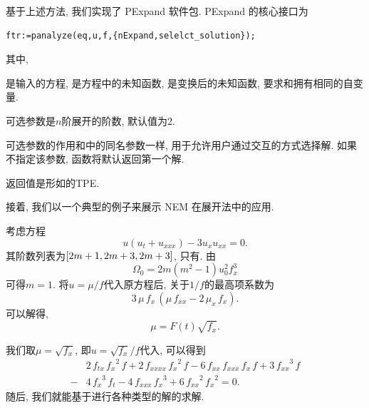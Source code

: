 基于上述方法, 我们实现了 PExpand 软件包. PExpand 的核心接口为
\begin{verbatim}
ftr:=panalyze(eq,u,f,{nExpand,selelct_solution});
\end{verbatim}
其中,
\begin{compactitem}[\textbullet]
\item {}是输入的方程, 是方程中的未知函数, 是变换后的未知函数, 要求和拥有相同的自变量.
\item 可选参数是$n$阶展开的阶数, 默认值为2.
\item 可选参数的作用和中的同名参数一样, 用于允许用户通过交互的方式选择解. 如果不指定该参数, 函数将默认返回第一个解. 
\item 返回值是形如的TPE. 
\end{compactitem}

接着, 我们以一个典型的例子来展示 NEM 在\Painleve{}展开法中的应用.

\begin{example}
考虑方程
\begin{equation}
    u(u_t+u_{xxx})-3u_x u_{xx}=0. \label{pseq}
\end{equation}
其阶数列表为$\left[2m+1,2m+3,2m+3\right]$, 只有\BPthree{}. 由
\begin{equation}
    \Omega_0=2m(m^2-1)u_0^2f_x^3
\end{equation}
可得$m=1$. 将$u=\mu/f$代入原方程后, 关于$1/f$的最高项系数为
\begin{equation}
    3\,\mu\,{{f}_{x}}\,\left( \mu\,{{f}_{xx}}-2\,{{\mu}_{x}}\,{{f}_{x}}\right) .
\end{equation}
可以解得, 
\begin{equation}
    \mu=F(t)\sqrt{f_x}.
\end{equation}
\end{example}
我们取$\mu=\sqrt{f_x}$, 即$u=\sqrt{f_x}/f$代入, 可以得到
\begin{equation}
\begin{split}
& 2\,{{f}_{tx}}\,{{{f}_{x}}}^{2}\,f+2\,{{f}_{xxxx}}\,{{{f}_{x}}}^{2}\,f-6\,{{f}_{xx}}\,{{f}_{xxx}}\,{{f}_{x}}\,f+3\,{{{f}_{xx}}}^{3}\,f \\
-&4\,{{{f}_{x}}}^{3}\,{{f}_{t}}-4\,{{f}_{xxx}}\,{{{f}_{x}}}^{3}+6\,{{{f}_{xx}}}^{2}\,{{{f}_{x}}}^{2}=0.
\end{split} \label{pseq-f}
\end{equation}
随后, 我们就能基于进行各种类型的解的求解.

